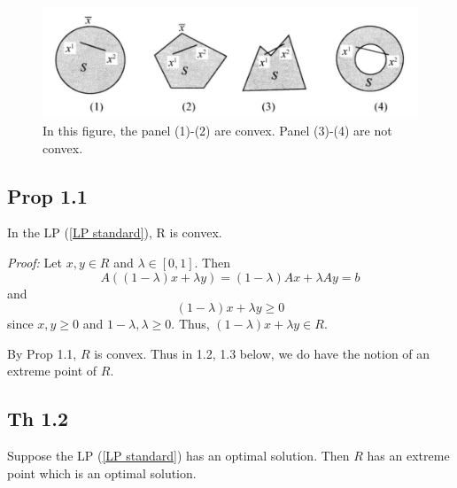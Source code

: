 \begin{figure}
    \centering
    \includegraphics[scale=0.2]{picture_1.png}
    \caption{In this figure, the panel (1)-(2) are convex. Panel (3)-(4) are not convex.}
    \label{fig:enter-label}
\end{figure}

\subsection{Prop 1.1  }
\begin{proposition}
    In the LP (\ref{LP standard}), R is convex.
\end{proposition}

\textit{Proof: } Let $x, y\in R$ and $\lambda\in [0, 1]$. Then 
\begin{equation}
    A\left((1-\lambda)x + \lambda y\right) = (1-\lambda)Ax + \lambda Ay = b\nonumber
\end{equation}
and
\begin{equation*}
    (1-\lambda)x + \lambda y \ge 0
\end{equation*}
since $x, y \ge 0$ and $1-\lambda, \lambda\ge 0$. Thus, $(1-\lambda)x + \lambda y\in R$.

By Prop 1.1, $R$ is convex. Thus in 1.2, 1.3 below, we do have the notion of an extreme point of $R$.

\subsection{Th 1.2}\label{Th 1.2}
\begin{theorem}
    Suppose the LP (\ref{LP standard}) has an optimal solution. Then $R$ has an extreme point which is an optimal solution.
\end{theorem}

